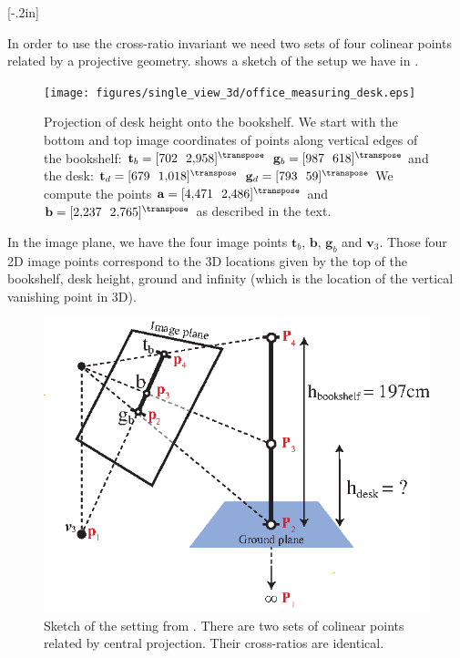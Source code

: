 [-.2in]


In order to use the cross-ratio invariant we need two sets of four colinear points related by a projective geometry. \Fig{\ref{fig:office_measuring_desk_sketch}} shows a sketch of the setup we have in \fig{\ref{fig:office_measuring_desk}}. 


\begin{figure}[t]
\centerline{
\texttt{[image: figures/single\_view\_3d/office\_measuring\_desk.eps]}
} 
\caption{Projection of desk height onto the bookshelf. We start with the bottom and top image coordinates of points along vertical edges of the bookshelf: 
$\mathbf{t}_b = [702~~2{,}958]^\transpose$ 
$\mathbf{g}_b= [987~~618]^\transpose$ 
and the desk: 
$\mathbf{t}_d = [679~~1{,}018]^\transpose$ 
$\mathbf{g}_d= [793~~59]^\transpose$ 
We compute the points 
$\mathbf{a}= [4{,}471~~2{,}486]^\transpose$ 
and
$\mathbf{b}= [2{,}237~~2{,}765]^\transpose$ 
as described in the text.
}
\label{fig:office_measuring_desk}
\end{figure}


In the image plane, we have the four image points $\mathbf{t}_b$, $\mathbf{b}$, $\mathbf{g}_b$ and $\mathbf{v}_3$. Those four 2D image points correspond to the 3D locations given by the top of the bookshelf, desk height, ground and infinity (which is the location of the vertical vanishing point in 3D).


\begin{figure}
\centerline{
\includegraphics[width=0.7\linewidth]{figures/single_view_3d/office_measuring_desk_sketch.eps}
} 
\caption{Sketch of the setting from \fig{\ref{fig:office_measuring_desk}}. There are two sets of colinear points related by central projection. Their cross-ratios are identical.}
\label{fig:office_measuring_desk_sketch}
\end{figure}

